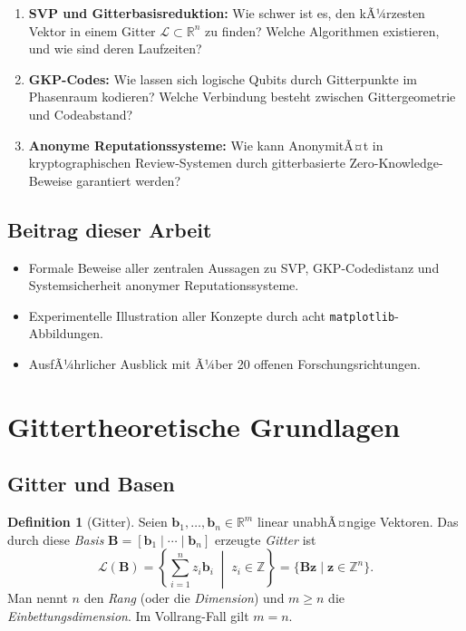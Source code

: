 ﻿\documentclass[a4paper,12pt]{article}
\theoremstyle{definition}
\newtheorem{definition}{Definition}
\newcommand{\Z}{\mathbb{Z}}
\newcommand{\R}{\mathbb{R}}
\newcommand{\Lat}{\mathcal{L}}
\newcommand{\B}{\mathbf{B}}
\begin{document}
\begin{enumerate}
    \item \textbf{SVP und Gitterbasisreduktion:}
          Wie schwer ist es, den kÃ¼rzesten Vektor in einem Gitter $\Lat \subset \R^n$ zu finden?
          Welche Algorithmen existieren, und wie sind deren Laufzeiten?

    \item \textbf{GKP-Codes:}
          Wie lassen sich logische Qubits durch Gitterpunkte im Phasenraum kodieren?
          Welche Verbindung besteht zwischen Gittergeometrie und Codeabstand?

    \item \textbf{Anonyme Reputationssysteme:}
          Wie kann AnonymitÃ¤t in kryptographischen Review-Systemen durch gitterbasierte
          Zero-Knowledge-Beweise garantiert werden?
\end{enumerate}

\subsection{Beitrag dieser Arbeit}

\begin{itemize}
    \item Formale Beweise aller zentralen Aussagen zu SVP, GKP-Codedistanz und
          Systemsicherheit anonymer Reputationssysteme.
    \item Experimentelle Illustration aller Konzepte durch acht \texttt{matplotlib}-Abbildungen.
    \item AusfÃ¼hrlicher Ausblick mit Ã¼ber 20 offenen Forschungsrichtungen.
\end{itemize}

\section{Gittertheoretische Grundlagen}

\subsection{Gitter und Basen}

\begin{definition}[Gitter]
\label{def:gitter}
Seien $\mathbf{b}_1, \ldots, \mathbf{b}_n \in \R^m$ linear unabhÃ¤ngige Vektoren.
Das durch diese \emph{Basis} $\B = [\mathbf{b}_1 \mid \cdots \mid \mathbf{b}_n]$ erzeugte
\emph{Gitter} ist
\[
    \Lat(\B) = \left\{ \sum_{i=1}^{n} z_i \mathbf{b}_i \;\middle|\; z_i \in \Z \right\}
             = \{ \B \mathbf{z} \mid \mathbf{z} \in \Z^n \}.
\]
Man nennt $n$ den \emph{Rang} (oder die \emph{Dimension}) und $m \geq n$ die
\emph{Einbettungsdimension}.
Im Vollrang-Fall gilt $m = n$.
\end{definition}
\end{document}
